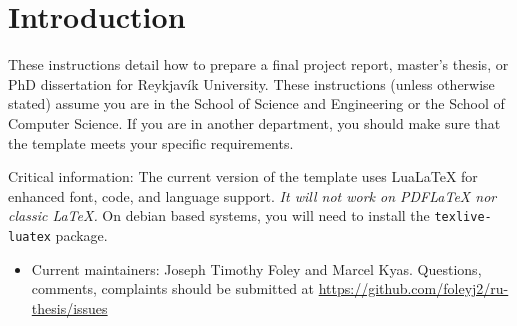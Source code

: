 
\newcommand{\TIheadofgrad}{Slawomir Koziel~\formatemail{slawomir} or TD Person}
\newcommand{\TItvdadmin}{Sigrún Þorgeirsdóttir~\formatemail{sigrunth}}

\section{Introduction} %
These instructions detail how to prepare a final project report, master's thesis, or PhD dissertation for Reykjavík University.
These instructions (unless otherwise stated) assume you are in the School of Science and Engineering or the School of Computer Science.
If you are in another department, you should make sure that the template meets your specific requirements.

Critical information:  The current version of the template uses Lua\LaTeX{} for enhanced font, code, and language support.
{\em It will not work on PDF\LaTeX{} nor classic \LaTeX.}
On debian based systems, you will need to install the \verb|texlive-luatex| package.

\begin{itemize}
\item Current maintainers: Joseph Timothy Foley and Marcel Kyas.
  Questions, comments, complaints should be submitted at \url{https://github.com/foleyj2/ru-thesis/issues}

\end{itemize}

